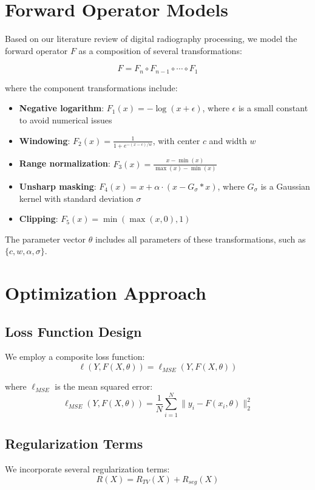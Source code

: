 \documentclass[nomenclature, english, bibtex]{kththesis}
\numberwithin{listing}{chapter}
\begin{document}
\section{Forward Operator Models}
Based on our literature review of digital radiography processing, we model the forward operator $F$ as a composition of several transformations:

\begin{equation}
F = F_n \circ F_{n-1} \circ \cdots \circ F_1
\end{equation}

where the component transformations include:
\begin{itemize}
    \item \textbf{Negative logarithm}: $F_1(x) = -\log(x + \epsilon)$, where $\epsilon$ is a small constant to avoid numerical issues
    \item \textbf{Windowing}: $F_2(x) = \frac{1}{1+e^{-(x-c)/w}}$, with center $c$ and width $w$
    \item \textbf{Range normalization}: $F_3(x) = \frac{x - \min(x)}{\max(x) - \min(x)}$
    \item \textbf{Unsharp masking}: $F_4(x) = x + \alpha \cdot (x - G_\sigma * x)$, where $G_\sigma$ is a Gaussian kernel with standard deviation $\sigma$
    \item \textbf{Clipping}: $F_5(x) = \min(\max(x, 0), 1)$
\end{itemize}

The parameter vector $\theta$ includes all parameters of these transformations, such as $\{c, w, \alpha, \sigma\}$.

\section{Optimization Approach}
\subsection{Loss Function Design}
We employ a composite loss function:
\begin{equation}
\ell(Y, F(X, \theta)) = \ell_{MSE}(Y, F(X, \theta))
\end{equation}

where $\ell_{MSE}$ is the mean squared error:
\begin{equation}
\ell_{MSE}(Y, F(X, \theta)) = \frac{1}{N} \sum_{i=1}^N \|y_i - F(x_i, \theta)\|_2^2
\end{equation}

\subsection{Regularization Terms}
We incorporate several regularization terms:
\begin{equation}
R(X) = R_{TV}(X) + R_{seg}(X)
\end{equation}
\end{document}
